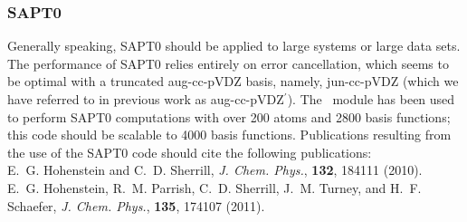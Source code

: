 \subsubsection{SAPT0}

Generally speaking, SAPT0 should be applied to large systems or large data
sets. The performance of SAPT0 relies entirely on error cancellation, which
seems to be optimal with a truncated aug-cc-pVDZ basis, namely,
jun-cc-pVDZ (which we have referred to in previous work as
aug-cc-pVDZ$^{\prime}$).
The \PSIsapt\ module has been used to perform SAPT0 computations with over
200 atoms and 2800 basis functions; this code should be scalable to 4000
basis functions. Publications resulting from the use of the SAPT0 code 
should cite the following publications: \\[10pt]
E.~G. Hohenstein and C.~D. Sherrill, 
{\em J. Chem. Phys.}, {\bf 132}, 184111 (2010). \\[10pt]
E.~G. Hohenstein, R.~M. Parrish, C.~D. Sherrill, J.~M. Turney, and H.~F.
Schaefer, {\em J. Chem. Phys.}, {\bf 135}, 174107 (2011). 

